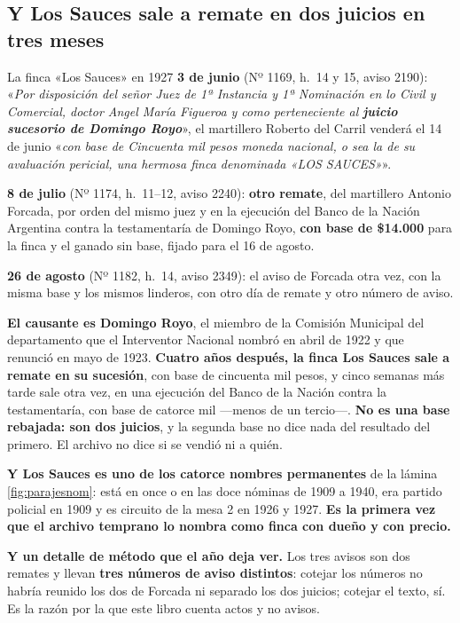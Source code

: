 \subsection*{Y Los Sauces sale a remate en dos juicios en tres meses}

\begin{ficha}{La finca «Los Sauces» en 1927}
\textbf{3 de junio} (Nº 1169, h.\ 14 y 15, aviso 2190): «\textit{Por disposición del señor Juez de
1ª Instancia y 1ª Nominación en lo Civil y Comercial, doctor Angel María Figueroa y como
perteneciente al \textbf{juicio sucesorio de Domingo Royo}}», el martillero Roberto del Carril
venderá el 14 de junio «\textit{con base de Cincuenta mil pesos moneda nacional, o sea la de su
avaluación pericial, una hermosa finca denominada «LOS SAUCES»}».

\textbf{8 de julio} (Nº 1174, h.\ 11--12, aviso 2240): \textbf{otro remate}, del martillero Antonio Forcada, por orden del mismo juez y en la ejecución del Banco de la Nación Argentina contra la testamentaría de Domingo Royo, \textbf{con base de
\$14.000} para la finca y el ganado sin base, fijado para el 16 de agosto.

\textbf{26 de agosto} (Nº 1182, h.\ 14, aviso 2349): el aviso de Forcada otra vez, con la misma base y los mismos
linderos, con otro día de remate y otro número de aviso.
\end{ficha}

\begin{cautela}
\textbf{El causante es Domingo Royo}, el miembro de la Comisión Municipal del departamento que el
Interventor Nacional nombró en abril de 1922 y que renunció en mayo de 1923. \textbf{Cuatro años
después, la finca Los Sauces sale a remate en su sucesión}, con base de cincuenta mil pesos, y cinco semanas más tarde sale otra vez, en una ejecución del Banco de la Nación contra la testamentaría, con base de
catorce mil ---menos de un tercio---. \textbf{No es una base rebajada: son dos juicios}, y la segunda base no dice nada del resultado del primero. El archivo no dice si se vendió
ni a quién.

\textbf{Y Los Sauces es uno de los catorce nombres permanentes} de la lámina
\ref{fig:parajesnom}: está en once o en las doce nóminas de 1909 a 1940, era partido policial en 1909 y es
circuito de la mesa 2 en 1926 y 1927. \textbf{Es la primera vez que el archivo temprano lo nombra
como finca con dueño y con precio.}

\textbf{Y un detalle de método que el año deja ver.} Los tres avisos son dos remates y llevan
\textbf{tres números de aviso distintos}: cotejar los números no habría reunido los dos de Forcada ni separado los dos juicios; cotejar el
texto, sí. Es la razón por la que este libro cuenta actos y no avisos.
\end{cautela}

